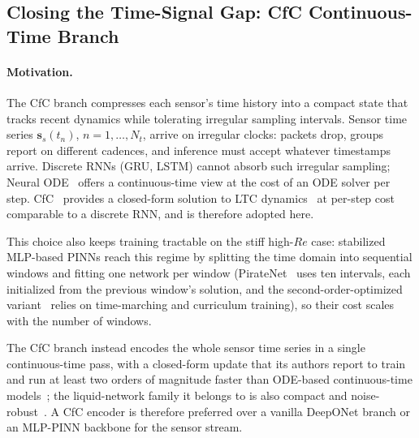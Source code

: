 \subsection{Closing the Time-Signal Gap: CfC Continuous-Time Branch}
\label{subsec:cfc_encoder}

\paragraph{Motivation.}
The CfC branch compresses each sensor's time history into a compact state that tracks recent dynamics while tolerating irregular sampling intervals. Sensor time series $\mathbf{s}_s(t_n)$, $n=1,\ldots,N_t$, arrive on irregular clocks: packets drop, groups report on different cadences, and inference must accept whatever timestamps arrive. Discrete RNNs (GRU, LSTM) cannot absorb such irregular sampling; Neural ODE~\cite{Chen2018NODE} offers a continuous-time view at the cost of an ODE solver per step. CfC~\cite{Hasani2022CfC} provides a closed-form solution to LTC dynamics~\cite{Hasani2021LTC} at per-step cost comparable to a discrete RNN, and is therefore adopted here.

This choice also keeps training tractable on the stiff high-$Re$ case: stabilized MLP-based PINNs reach this regime by splitting the time domain into sequential windows and fitting one network per window (PirateNet~\cite{Wang2024JMLR} uses ten intervals, each initialized from the previous window's solution, and the second-order-optimized variant~\cite{wang2025gradientalignmentpinns} relies on time-marching and curriculum training), so their cost scales with the number of windows.

The CfC branch instead encodes the whole sensor time series in a single continuous-time pass, with a closed-form update that its authors report to train and run at least two orders of magnitude faster than ODE-based continuous-time models~\cite{Hasani2022CfC}; the liquid-network family it belongs to is also compact and noise-robust~\cite{Lechner2020NCP}. A CfC encoder is therefore preferred over a vanilla DeepONet branch or an MLP-PINN backbone for the sensor stream.

